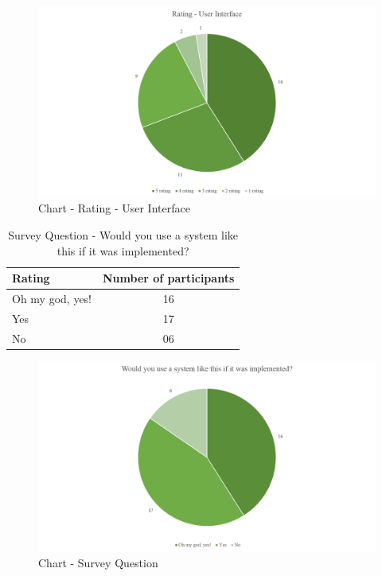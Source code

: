 \begin {itemize}
\begin {figure} [h]
\centering
\includegraphics [scale=0.5] {ratingUserInterface}
\caption [Chart - Rating - User Interface] {Chart - Rating - User Interface}
\label {image-ratingUserInterface}
\end {figure}

\begin{table} [h]
\centering
\begin{tabular}{|l|c|}
\hline
Rating & Number of participants \\
\hline
Oh my god, yes!	&16 \\
Yes	&17 \\
No	&06 \\
\hline
\end{tabular}
\caption{Survey Question - Would you use a system like this if it was implemented?}
\label{table-survey-question-WouldYouUseASystemLikeThis}
\end{table}

\begin {figure} [h]
\centering
\includegraphics [scale=0.5] {questionWouldYouUse}
\caption [Chart - Survey Question] {Chart - Survey Question}
\label {image-questionWouldYouUse}
\end {figure}

\end {itemize}

